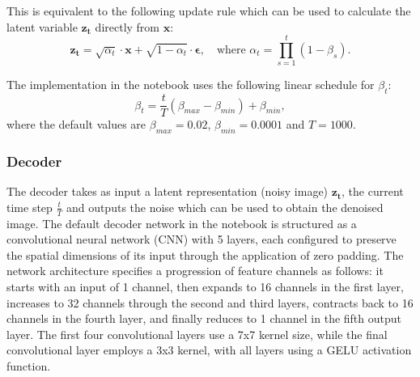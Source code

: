 \documentclass[11pt]{article}
\begin{document}
This is equivalent to the following update rule which can be used to calculate the latent variable $\mathbf{z_t}$ directly from $\mathbf{x}$:
\begin{equation}
    \mathbf{z_t} = \sqrt{\alpha_t} \cdot \mathbf{x} + \sqrt{1 - \alpha_t} \cdot \boldsymbol{\epsilon}, \quad \text{where } \alpha_t = \prod_{s=1}^{t} (1 - \beta_s).
    \label{eq:z_t_alpha_gauss_noise}
\end{equation}

The implementation in the notebook uses the following linear schedule for $\beta_t$:
\begin{equation}
    \beta_t = \frac{t}{T}(\beta_{max}-\beta_{min})+ \beta_{min},
\end{equation}
where the default values are $\beta_{max} = 0.02$, $\beta_{min} = 0.0001$ and $T=1000$.

\subsubsection{Decoder}
The decoder takes as input a latent representation (noisy image) $\mathbf{z_t}$, the current time step $\frac{t}{T}$ and outputs the noise which can be used to obtain the denoised image. The default decoder network in the notebook is structured as a convolutional neural network (CNN) with 5 layers, each configured to preserve the spatial dimensions of its input through the application of zero padding. The network architecture specifies a progression of feature channels as follows: it starts with an input of 1 channel, then expands to 16 channels in the first layer, increases to 32 channels through the second and third layers, contracts back to 16 channels in the fourth layer, and finally reduces to 1 channel in the fifth output layer. The first four convolutional layers use a 7x7 kernel size, while the final convolutional layer employs a 3x3 kernel, with all layers using a GELU activation function.
\end{document}
